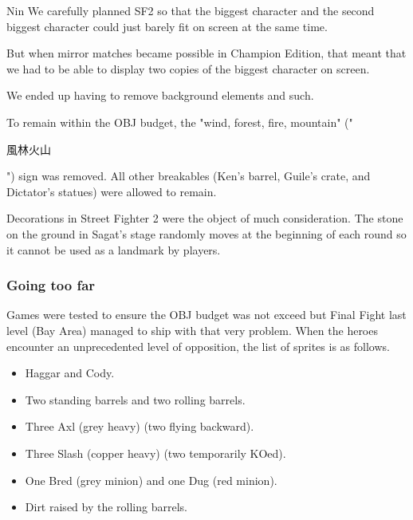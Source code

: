 \begin{q}{Nin}
We carefully planned SF2 so that the biggest character and the second biggest character could just barely fit on screen at the same time. 

But when mirror matches became possible in Champion Edition, that meant that we had to be able to display two copies of the biggest character on screen. 

We ended up having to remove background elements and such.
\end{q}

To remain within the OBJ budget, the "wind, forest, fire, mountain" ("\begin{CJK}{UTF8}{min}風林火山\end{CJK}") sign was removed. All other breakables (Ken's barrel, Guile's crate, and Dictator's statues) were allowed to remain.

\begin{trivia}
Decorations in Street Fighter 2 were the object of much consideration. The stone on the ground in Sagat's stage randomly moves at the beginning of each round so it cannot be used as a landmark by players.

\end{trivia}

\vfill
{}




\subsubsection{Going too far} \label{going_too_far}
Games were tested to ensure the OBJ budget was not exceed but Final Fight last level (Bay Area) managed to ship with that very problem. When the heroes encounter an unprecedented level of opposition, the list of sprites is as follows\cite{ffoverload}.

\begin{itemize}[topsep=0pt]
\item Haggar and Cody.
\item Two standing barrels and two rolling barrels.
\item Three Axl (grey heavy) (two flying backward).
\item Three Slash (copper heavy) (two temporarily KOed).
\item One Bred (grey minion) and one Dug (red minion).
\item Dirt raised by the rolling barrels.
\end{itemize}

